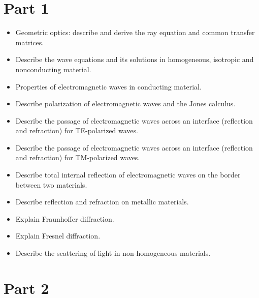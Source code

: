 



\section{Part 1}
\begin{itemize}

    \item Geometric optics: describe and derive the ray equation and common transfer matrices.

    \item Describe the wave equations and its solutions in homogeneous, isotropic and nonconducting material.

    \item Properties of electromagnetic waves in conducting material.

    \item Describe polarization of electromagnetic waves and the Jones calculus.

    \item Describe the passage of electromagnetic waves across an interface (reflection and refraction) for TE-polarized waves.

    \item Describe the passage of electromagnetic waves across an interface (reflection and refraction) for TM-polarized waves.

    \item Describe total internal reflection of electromagnetic waves on the border between two materials.

    \item Describe reflection and refraction on metallic materials.

    \item Explain Fraunhoffer diffraction.

    \item Explain Fresnel diffraction.

    \item Describe the scattering of light in non-homogeneous materials.

\end{itemize}

\section{Part 2}

